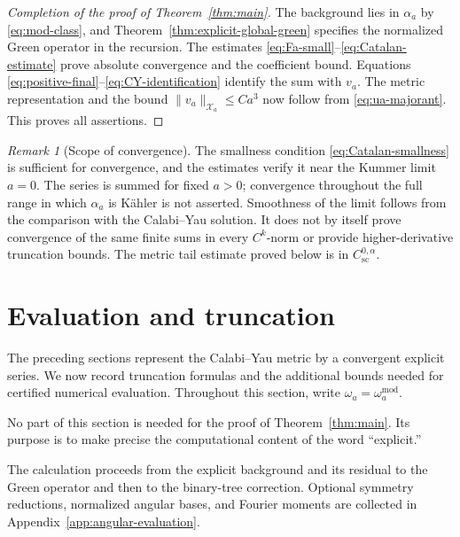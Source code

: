 \documentclass[11pt,a4paper,twoside]{article}
\numberwithin{equation}{section}
\theoremstyle{definition}
\theoremstyle{remark}
\newtheorem{remark}[theorem]{Remark}
\begin{document}
\begin{proof}[Completion of the proof of Theorem~\ref{thm:main}]
The background lies in \(\alpha_a\) by \eqref{eq:mod-class},
and Theorem~\ref{thm:explicit-global-green} specifies the normalized
Green operator in the recursion. The estimates
\eqref{eq:Fa-small}--\eqref{eq:Catalan-estimate} prove absolute
convergence and the coefficient bound. Equations
\eqref{eq:positive-final}--\eqref{eq:CY-identification} identify
the sum with \(v_a\). The metric representation and the bound
\(\|v_a\|_{\mathcal X_a}\le Ca^3\) now follow from
\eqref{eq:ua-majorant}. This proves all assertions.
\end{proof}

\begin{remark}[Scope of convergence]
\label{rem:fixed-a-convergence}
The smallness condition \eqref{eq:Catalan-smallness} is sufficient
for convergence, and the estimates verify it near the Kummer limit
\(a=0\). The series is summed for fixed \(a>0\); convergence
throughout the full range in which \(\alpha_a\) is K\"ahler is
not asserted. Smoothness of the limit follows from the comparison
with the Calabi--Yau solution. It does not by itself prove convergence
of the same finite sums in every \(C^k\)-norm or provide
higher-derivative truncation bounds. The metric tail estimate proved
below is in \(C_{\mathrm{sc}}^{0,\alpha}\).
\end{remark}

\section{Evaluation and truncation}
\label{sec:computational-realization}

The preceding sections represent the Calabi--Yau metric by a
convergent explicit series. We now record truncation formulas and
the additional bounds needed for certified numerical evaluation.
Throughout this section, write \(\omega_a=\omega_a^{\mathrm{mod}}\).

No part of this section is needed for the proof of
Theorem~\ref{thm:main}.  Its purpose is to make precise the
computational content of the word ``explicit.''

The calculation proceeds from the explicit background and its residual
to the Green operator and then to the binary-tree correction.
Optional symmetry reductions, normalized angular bases, and Fourier
moments are collected in Appendix~\ref{app:angular-evaluation}.
\end{document}

